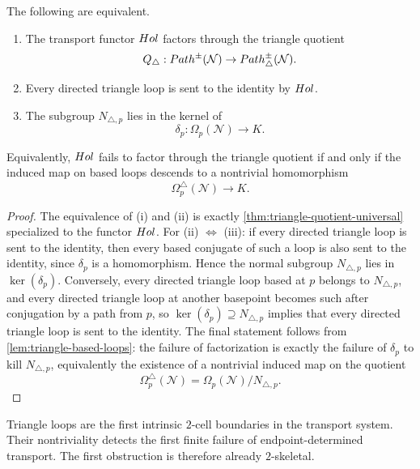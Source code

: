 \begin{theorem}
	\label{thm:triangle-loop}
	The following are equivalent.
	\begin{enumerate}[label=\textup{(\roman*)}]
		\item
		      The transport functor \(Hol\) factors through the triangle quotient
		      \[
			      Q_\triangle:Path^\pm(\mathcal N)\to Path^\pm_\triangle(\mathcal N).
		      \]
		\item
		      Every directed triangle loop is sent to the identity by \(Hol\).
		\item
		      The subgroup \(N_{\triangle,p}\) lies in the kernel of
		      \[
			      \delta_p:\Omega_p(\mathcal N)\to K.
		      \]
	\end{enumerate}
	Equivalently, \(Hol\) fails to factor through the triangle quotient if
	and only if the induced map on based loops descends to a nontrivial
	homomorphism
	\[
		\Omega_p^\triangle(\mathcal N)\to K.
	\]
\end{theorem}
\begin{proof}
	The equivalence of \textup{(i)} and \textup{(ii)} is exactly
	\cref{thm:triangle-quotient-universal} specialized to the functor
	\(Hol\).
	For \textup{(ii)} \(\Longleftrightarrow\) \textup{(iii)}: if every
	directed triangle loop is sent to the identity, then every based
	conjugate of such a loop is also sent to the identity, since \(\delta_p\)
	is a homomorphism.  Hence the normal subgroup \(N_{\triangle,p}\) lies in
	\(\ker(\delta_p)\).  Conversely, every directed triangle loop based at
	\(p\) belongs to \(N_{\triangle,p}\), and every directed triangle loop at
	another basepoint becomes such after conjugation by a path from \(p\),
	so \(\ker(\delta_p)\supseteq N_{\triangle,p}\) implies that every
	directed triangle loop is sent to the identity.
	The final statement follows from \cref{lem:triangle-based-loops}: the
	failure of factorization is exactly the failure of \(\delta_p\) to kill
	\(N_{\triangle,p}\), equivalently the existence of a nontrivial induced
	map on the quotient
	\[
		\Omega_p^\triangle(\mathcal N)
		=
		\Omega_p(\mathcal N)/N_{\triangle,p}.
	\]
\end{proof}
\begin{remark}
	\label{rem:triangle-2cell}
	Triangle loops are the first intrinsic \(2\)-cell boundaries in the
	transport system.  Their nontriviality detects the first finite failure
	of endpoint-determined transport.  The first obstruction is therefore
	already \(2\)-skeletal.
\end{remark}
